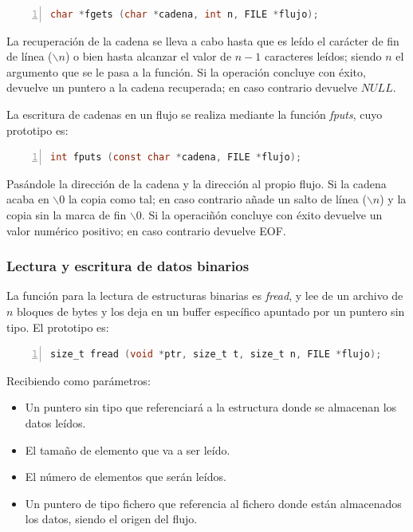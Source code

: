 \documentclass[a4paper, 11pt, titlepage]{article}
\begin{document}
            \begin{lstlisting}[language=C,numbers=left]
    char *fgets (char *cadena, int n, FILE *flujo);\end{lstlisting}
        
            La recuperación de la cadena se lleva a cabo hasta que es leído el carácter 
            de fin de línea ($\backslash n$) o bien hasta alcanzar el valor de 
            $n-1$ caracteres leídos; siendo $n$ el argumento que se le pasa a la función.
            Si la operación concluye con éxito, devuelve un puntero a la cadena recuperada;
            en caso contrario devuelve $NULL$.

            La escritura de cadenas en un flujo se realiza mediante la función \textit{fputs},
            cuyo prototipo es:

            \begin{lstlisting}[language=C,numbers=left]
    int fputs (const char *cadena, FILE *flujo);\end{lstlisting}
        
            Pasándole la dirección de la cadena y la dirección al propio flujo. Si la 
            cadena acaba en $\backslash 0$ la copia como tal; en caso contrario 
            añade un salto de línea ($\backslash n$) y la copia sin la marca de fin $\backslash 0$.
            Si la operaciñón concluye con éxito devuelve un valor numérico positivo; en caso 
            contrario devuelve EOF.

        \subsubsection{Lectura y escritura de datos binarios}\label{ficherosbinarios}

            La función para la lectura de estructuras binarias es \textit{fread}, 
            y lee de un archivo de $n$ bloques de bytes y los deja en un buffer 
            específico apuntado por un puntero sin tipo. El prototipo es:
            
            \begin{lstlisting}[language=C,numbers=left]
    size_t fread (void *ptr, size_t t, size_t n, FILE *flujo);\end{lstlisting}

            Recibiendo como parámetros:

            \begin{itemize}
                \item Un puntero sin tipo que referenciará a la estructura donde se almacenan los 
                datos leídos.
                \item El tamaño de elemento que va a ser leído.
                \item El número de elementos que serán leídos.
                \item Un puntero de tipo fichero que referencia al fichero donde están almacenados 
                los datos, siendo el origen del flujo.
            \end{itemize}
\end{document}
